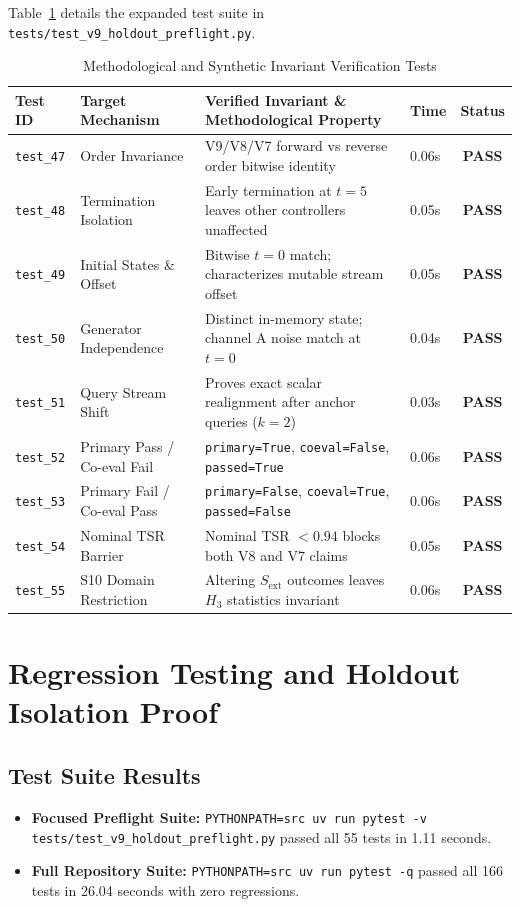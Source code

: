 \documentclass[10pt,a4paper]{article}
\begin{document}
Table~\ref{tab:audit_tests_17} details the expanded test suite in \texttt{tests/test\_v9\_holdout\_preflight.py}.

\begin{table}[htbp]
\centering
\small
\caption{Methodological and Synthetic Invariant Verification Tests}
\label{tab:audit_tests_17}
\begin{tabularx}{\textwidth}{llXlc}
\toprule
\textbf{Test ID} & \textbf{Target Mechanism} & \textbf{Verified Invariant \& Methodological Property} & \textbf{Time} & \textbf{Status} \\
\midrule
\texttt{test\_47} & Order Invariance & V9/V8/V7 forward vs reverse order bitwise identity & 0.06s & \textbf{PASS} \\
\texttt{test\_48} & Termination Isolation & Early termination at $t=5$ leaves other controllers unaffected & 0.05s & \textbf{PASS} \\
\texttt{test\_49} & Initial States \& Offset & Bitwise $t=0$ match; characterizes mutable stream offset & 0.05s & \textbf{PASS} \\
\texttt{test\_50} & Generator Independence & Distinct in-memory state; channel A noise match at $t=0$ & 0.04s & \textbf{PASS} \\
\texttt{test\_51} & Query Stream Shift & Proves exact scalar realignment after anchor queries ($k=2$) & 0.03s & \textbf{PASS} \\
\texttt{test\_52} & Primary Pass / Co-eval Fail & \texttt{primary=True}, \texttt{coeval=False}, \texttt{passed=True} & 0.06s & \textbf{PASS} \\
\texttt{test\_53} & Primary Fail / Co-eval Pass & \texttt{primary=False}, \texttt{coeval=True}, \texttt{passed=False} & 0.06s & \textbf{PASS} \\
\texttt{test\_54} & Nominal TSR Barrier & Nominal TSR $< 0.94$ blocks both V8 and V7 claims & 0.05s & \textbf{PASS} \\
\texttt{test\_55} & S10 Domain Restriction & Altering $S_{\mathrm{ext}}$ outcomes leaves $H_3$ statistics invariant & 0.06s & \textbf{PASS} \\
\bottomrule
\end{tabularx}
\end{table}

\section{Regression Testing and Holdout Isolation Proof}

\subsection{Test Suite Results}
\begin{itemize}
    \item \textbf{Focused Preflight Suite:} \texttt{PYTHONPATH=src uv run pytest -v tests/test\_v9\_holdout\_preflight.py} passed all 55 tests in 1.11 seconds.
    \item \textbf{Full Repository Suite:} \texttt{PYTHONPATH=src uv run pytest -q} passed all 166 tests in 26.04 seconds with zero regressions.
\end{itemize}
\end{document}
